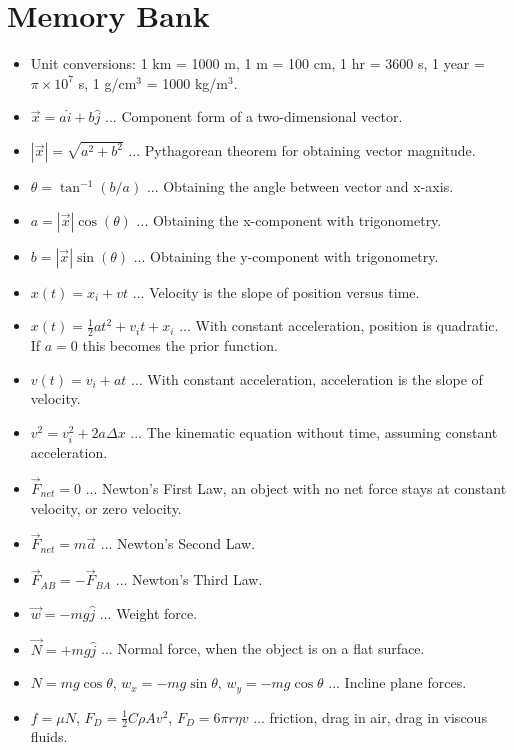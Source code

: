 \documentclass[10pt]{article}
\begin{document}
\maketitle

\section{Memory Bank}

\begin{itemize}
\item Unit conversions: 1 km = 1000 m, 1 m = 100 cm, 1 hr = 3600 s, 1 year = $\pi \times 10^7$ s, 1 g/cm$^3$ = 1000 kg/m$^3$.
\item $\vec{x} = a \hat{i} + b\hat{j}$ ... Component form of a two-dimensional vector.
\item $|\vec{x}| = \sqrt{a^2+b^2}$ ... Pythagorean theorem for obtaining vector magnitude.
\item $\theta = \tan^{-1}(b/a)$ ... Obtaining the angle between vector and x-axis.
\item $a = |\vec{x}|\cos(\theta)$ ... Obtaining the x-component with trigonometry.
\item $b = |\vec{x}|\sin(\theta)$ ... Obtaining the y-component with trigonometry.
\item $x(t) = x_i + v t$ ... Velocity is the slope of position versus time.
\item $x(t) = \frac{1}{2} a t^2 + v_i t + x_i$ ... With constant acceleration, position is quadratic.  If $a=0$ this becomes the prior function.
\item $v(t) = v_i + a t$ ... With constant acceleration, acceleration is the slope of velocity.
\item $v^2 = v_i^2 + 2 a \Delta x$ ... The kinematic equation without time, assuming constant acceleration.
\item $\vec{F}_{net} = 0$ ... Newton's First Law, an object with no net force stays at constant velocity, or zero velocity.
\item $\vec{F}_{net} = m\vec{a}$ ... Newton's Second Law.
\item $\vec{F}_{AB} = -\vec{F}_{BA}$ ... Newton's Third Law.
\item $\vec{w} = - mg \hat{j}$ ... Weight force.
\item $\vec{N} = +mg\hat{j}$ ... Normal force, when the object is on a flat surface.
\item $N = mg\cos\theta$, $w_x = -mg\sin\theta$, $w_y = -mg\cos\theta$ ... Incline plane forces.
\item $f = \mu N$, $F_D = \frac{1}{2}C\rho A v^2$, $F_D = 6\pi r \eta v$ ... friction, drag in air, drag in viscous fluids.

\end{itemize}
\end{document}
